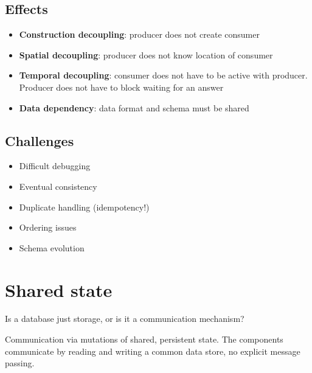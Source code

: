 \subsection{Effects}


\begin{itemize}
  \item \textbf{Construction decoupling}: producer does not create consumer
  \item \textbf{Spatial decoupling}: producer does not know location of consumer
  \item \textbf{Temporal decoupling}: consumer does not have to be active with producer. Producer does not have to
        block waiting for an answer
  \item \textbf{Data dependency}: data format and schema must be shared
\end{itemize}

\subsection{Challenges}

\begin{itemize}
  \item Difficult debugging
  \item Eventual consistency
  \item Duplicate handling (idempotency!)
  \item Ordering issues
  \item Schema evolution
\end{itemize}



\section{Shared state}
Is a database just storage, or is it a communication mechanism?

Communication via mutations of shared, persistent state. The components
communicate by reading and writing a common data store, no explicit message passing.

